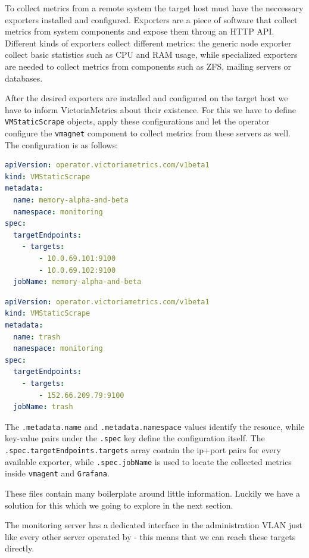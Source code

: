 To collect metrics from a remote system the target host must have the
neccessary exporters installed and configured. Exporters are a piece of
software that collect metrics from system components and expose them throug an
HTTP API. Different kinds of exporters collect different metrics: the generic
node exporter collect basic statistics such as CPU and RAM usage, while
specialized exporters are needed to collect metrics from components such as
ZFS, mailing servers or databases.

After the desired exporters are installed and configured on the target host we
have to inform VictoriaMetrics about their existence. For this we have to
define \verb+VMStaticScrape+ objects, apply these configurations and let the
operator configure the \verb+vmagnet+ component to collect metrics from these
servers as well. The configuration is as follows:

\begin{lstlisting}[language=yaml,caption=Configuration file for memory-alpha and memory-beta]
apiVersion: operator.victoriametrics.com/v1beta1
kind: VMStaticScrape
metadata:
  name: memory-alpha-and-beta
  namespace: monitoring
spec:
  targetEndpoints:
    - targets:
        - 10.0.69.101:9100
        - 10.0.69.102:9100
  jobName: memory-alpha-and-beta
\end{lstlisting}

\begin{lstlisting}[language=yaml,caption=Configuration file for trash]
apiVersion: operator.victoriametrics.com/v1beta1
kind: VMStaticScrape
metadata:
  name: trash
  namespace: monitoring
spec:
  targetEndpoints:
    - targets:
        - 152.66.209.79:9100
  jobName: trash
\end{lstlisting}

The \verb+.metadata.name+ and \verb+.metadata.namespace+ values identify the
resouce, while key-value pairs under the \verb+.spec+ key define the
configuration itself. The \verb+.spec.targetEndpoints.targets+ array contain
the ip+port pairs for every available exporter, while \verb+.spec.jobName+ is
used to locate the collected metrics inside \verb+vmagent+ and \verb+Grafana+.

These files contain many boilerplate around little information. Luckily we have
a solution for this which we going to explore in the next section.

The monitoring server has a dedicated interface in the administration VLAN just
like every other server operated by \kszk - this means that we can reach these
targets directly.

